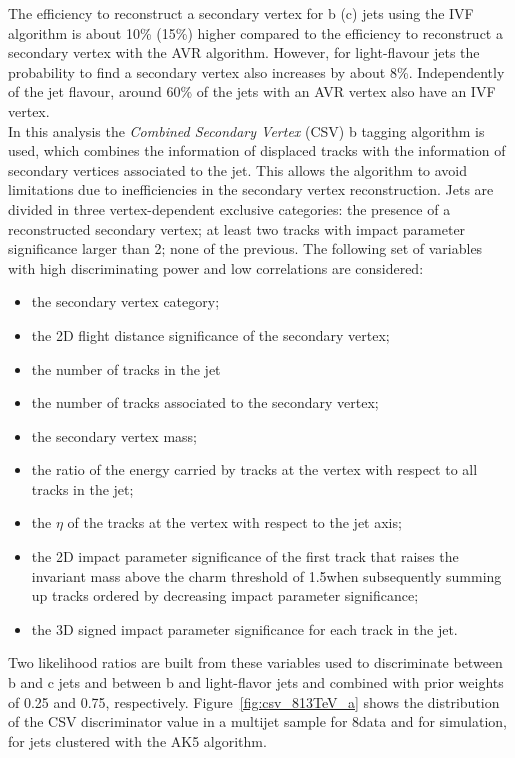  The efficiency to reconstruct a secondary vertex for b (c) jets using the IVF algorithm is about 10\% (15\%) higher compared to the efficiency to reconstruct a secondary vertex with the AVR algorithm. However, for light-flavour jets the probability to find a secondary vertex also increases by about 8\%. Independently of the jet flavour, around 60\% of the jets with an AVR vertex also have an IVF vertex.\\
 
In this analysis the \textit{Combined Secondary Vertex} (CSV) b tagging algorithm is used, which combines the information of displaced tracks with the information of secondary vertices associated to the jet.
This allows the algorithm to avoid limitations due to inefficiencies in the secondary vertex reconstruction. Jets are divided in three vertex-dependent exclusive categories: the presence of a reconstructed secondary vertex; at least two tracks with impact parameter significance larger than 2; none of the previous. The following set of variables with high discriminating power and low correlations are considered:

\begin{itemize}
\item the secondary vertex category;
\item the 2D flight distance significance of the secondary vertex;
\item the number of tracks in the jet
\item the number of tracks associated to the secondary vertex;
\item the secondary vertex mass;
\item the ratio of the energy carried by tracks at the vertex with respect to all tracks in the jet;
\item the $\eta$ of the tracks at the vertex with respect to the jet axis;
\item the 2D impact parameter significance of the first track that raises the invariant mass above the charm threshold of 1.5\GeV when subsequently summing up tracks ordered by decreasing impact parameter significance;
\item the 3D signed impact parameter significance for each track in the jet.
\end{itemize}

Two likelihood ratios are built from these variables used to discriminate between b and c jets and between b and light-flavor jets and combined with prior weights of 0.25 and 0.75, respectively. Figure~\ref{fig:csv_813TeV_a} shows the distribution of the CSV discriminator value in a multijet sample for 8\TeV data and for simulation, for jets clustered with the AK5 algorithm.

